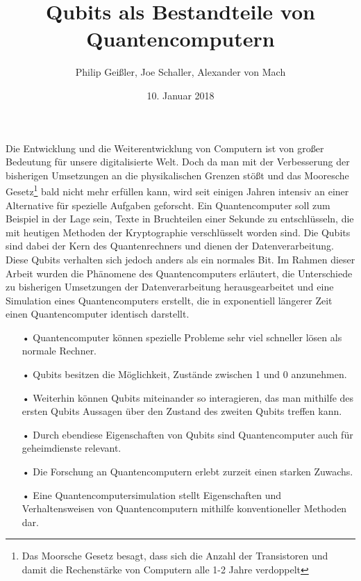 \documentclass[a4paper, 12pt]{scrartcl} %
\begin{document}
\title{Qubits als Bestandteile von Quantencomputern}
\author{Philip Geißler, Joe Schaller, Alexander von Mach}
\date{10. Januar 2018}

\maketitle


Die Entwicklung und die Weiterentwicklung von Computern ist von großer Bedeutung für unsere digitalisierte Welt. Doch da man mit der Verbesserung der bisherigen Umsetzungen an die physikalischen Grenzen stößt und das Mooresche Gesetz\footnote{Das Moorsche Gesetz besagt, dass sich die Anzahl der Transistoren und damit die Rechenstärke von Computern alle 1-2 Jahre verdoppelt} bald nicht mehr erfüllen kann, wird seit einigen Jahren intensiv an einer Alternative für spezielle Aufgaben geforscht. Ein Quantencomputer soll zum Beispiel in der Lage sein, Texte in Bruchteilen einer Sekunde zu entschlüsseln, die mit heutigen Methoden der Kryptographie verschlüsselt worden sind.
Die Qubits sind dabei der Kern des Quantenrechners und dienen der Datenverarbeitung. Diese Qubits verhalten sich jedoch anders als ein normales Bit.
Im Rahmen dieser Arbeit wurden die Phänomene des Quantencomputers erläutert, die Unterschiede zu bisherigen Umsetzungen der Datenverarbeitung herausgearbeitet und eine Simulation eines Quantencomputers erstellt, die in exponentiell längerer Zeit einen Quantencomputer identisch darstellt.
\newline


\begin{itemize}
\item[•]Quantencomputer können spezielle Probleme sehr viel schneller lösen als normale Rechner.
\item[•]Qubits besitzen die Möglichkeit, Zustände \glqq zwischen\grqq{} 1 und 0 anzunehmen.
\item[•]Weiterhin können Qubits miteinander so interagieren, das man mithilfe des ersten Qubits Aussagen über den Zustand des zweiten Qubits treffen kann.
\item[•]Durch ebendiese Eigenschaften von Qubits sind Quantencomputer auch für geheimdienste relevant. 
\item[•]Die Forschung an Quantencomputern erlebt zurzeit einen starken Zuwachs.
\item[•]Eine Quantencomputersimulation stellt Eigenschaften und Verhaltensweisen von Quantencomputern mithilfe konventioneller Methoden dar.

\end{itemize}
\end{document}
